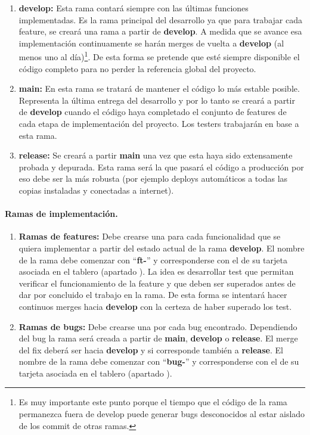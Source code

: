 \begin{enumerate}
	\renewcommand{\labelenumi}{\alph{enumi}.}
	\item \textbf{develop:} Esta rama contará siempre con las últimas funciones implementadas. Es la rama principal del desarrollo ya que para trabajar cada feature, se creará una rama a partir de \textbf{develop}. A medida que se avance esa implementación continuamente se harán merges de vuelta a \textbf{develop} (al menos uno al día)\footnote{Es muy importante este punto porque el tiempo que el código de la rama permanezca fuera de develop puede generar bugs desconocidos al estar aislado de los commit de otras ramas.}. De esta forma se pretende que esté siempre disponible el código completo para no perder la referencia global del proyecto. 
	
	\item \textbf{main:} En esta rama se tratará de mantener el código lo más estable posible. Representa la última entrega del desarrollo y por lo tanto se creará a partir de \textbf{develop} cuando el código haya completado el conjunto de features de cada etapa de implementación del proyecto. Los testers trabajarán en base a esta rama. 
	
	\item \textbf{release:} Se creará a partir \textbf{main} una vez que esta haya sido extensamente probada y depurada. Esta rama será la que pasará el código a producción por eso debe ser la más robusta (por ejemplo deploys automáticos a todas las copias instaladas y conectadas a internet).
\end{enumerate}

\paragraph{Ramas de implementación.}\label{pg:ramas-de-implementacion}
\begin{enumerate}
	\renewcommand{\labelenumi}{\alph{enumi}.}
	\item \textbf{Ramas de features:} Debe crearse una para cada funcionalidad que se quiera implementar a partir del estado actual de la rama \textbf{develop}. El nombre de la rama debe comenzar con “\textbf{ft-}” y corresponderse con el de su tarjeta asociada en el tablero (apartado ). La idea es desarrollar test que permitan verificar el funcionamiento de la feature y que deben ser superados antes de dar por concluido el trabajo en la rama. De esta forma se intentará hacer continuos merges hacia \textbf{develop} con la certeza de haber superado los test.
	
	\item \textbf{Ramas de bugs:} Debe crearse una por cada bug encontrado. Dependiendo del bug la rama será creada a partir de \textbf{main}, \textbf{develop} o \textbf{release}. El merge del fix deberá ser hacia \textbf{develop} y si corresponde también a \textbf{release}. El nombre de la rama debe comenzar con “\textbf{bug-}” y corresponderse con el de su tarjeta asociada en el tablero (apartado ).
\end{enumerate}

